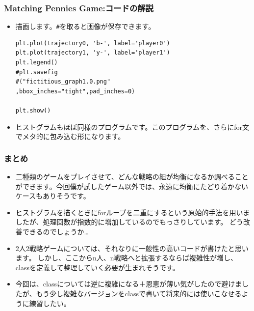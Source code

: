 \documentclass[dvipdfmx,fleqn]{beamer}
\begin{document}
\begin{frame}[containsverbatim]%
\frametitle{Matching Pennies Game:コードの解説}
\begin{itemize}\setlength{\parskip}{0.5em}
\item
描画します。\verb!#!を取ると画像が保存できます。
\begin{verbatim}
plt.plot(trajectory0, 'b-', label='player0')  
plt.plot(trajectory1, 'y-', label='player1')  
plt.legend()
#plt.savefig
#("fictitious_graph1.0.png"
,bbox_inches="tight",pad_inches=0)

plt.show()

\end{verbatim}
\item
ヒストグラムもほぼ同様のプログラムです。このプログラムを、さらにfor文でメタ的に包み込む形になります。

\end{itemize}
\end{frame}

\begin{frame}
\frametitle{まとめ}
\begin{itemize}\setlength{\parskip}{0.5em}
\item
二種類のゲームをプレイさせて、どんな戦略の組が均衡になるか調べることができます。今回僕が試したゲーム以外では、永遠に均衡にたどり着かないケースもありそうです。\pause

\item
ヒストグラムを描くときにforループを二重にするという原始的手法を用いましたが、処理回数が指数的に増加しているのでもっさりしています。
どう改善できるのでしょうか…\pause
\item
2人2戦略ゲームについては、それなりに一般性の高いコードが書けたと思います。
しかし、ここからn人、n戦略へと拡張するならば複雑性が増し、classを定義して整理していく必要が生まれそうです。\pause
\item
今回は、classについては逆に複雑になる＋恩恵が薄い気がしたので避けましたが、もう少し複雑なバージョンをclassで書いて将来的には使いこなせるように練習したい。\pause
\end{itemize}
\end{frame}
\end{document}
